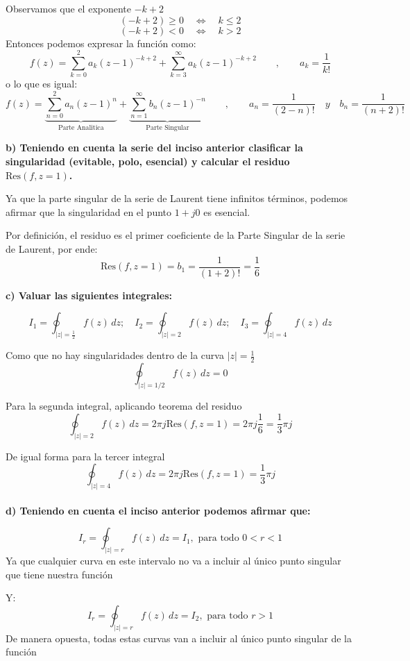 \documentclass[12pt,a4paper]{report}
\begin{document}
Observamos que el exponente $-k+2$
$$(-k+2) \geq 0 \quad \Leftrightarrow \quad k \leq 2$$
$$(-k+2) < 0 \quad \Leftrightarrow \quad k>2$$
Entonces podemos expresar la función como:
$$f(z) = \sum_{k=0}^{2}a_k(z - 1)^{-k+2} + \sum_{k=3}^{\infty}a_k(z - 1)^{-k+2}\qquad, \qquad a_k=\frac{1}{k!}$$
o lo que es igual:
$$f(z) = \underbrace{\sum_{n=0}^{2}a_n(z - 1)^{n}}_{\text{Parte Analitica}} + \underbrace{\sum_{n=1}^{\infty}b_n(z - 1)^{-n}}_{\text{Parte Singular}}
\qquad, \qquad a_n=\frac{1}{(2-n)!}\quad y \quad b_n=\frac{1}{(n+2)!}$$

\textbf{b)  Teniendo en cuenta la serie del inciso anterior clasificar la singularidad (evitable, polo, 
esencial) y calcular el residuo \( \text{Res}(f, z = 1) \).}

Ya que la parte singular de la serie de Laurent tiene infinitos términos, podemos afirmar que la singularidad
en el punto $1+j0$ es esencial.

Por definición, el residuo es el primer coeficiente de la Parte Singular de la serie de Laurent, por ende:
$$\text{Res}(f, z = 1) = b_1=\frac{1}{(1+2)!} = \frac{1}{6}$$

\textbf{c)  Valuar las siguientes integrales:}

$$ I_1 = \oint_{|z| =\frac{1}{2}} f(z) \, dz; \quad I_2 = \oint_{|z| = 2} f(z) \, dz; \quad I_3 = \oint_{|z| = 4} f(z) \, dz $$

Como que no hay singularidades dentro de la curva $|z|=\frac{1}{2}$
$$\oint_{|z| = 1/2} f(z) \, dz = 0$$

Para la segunda integral, aplicando teorema del residuo
$$\oint_{|z| = 2} f(z) \, dz = 2\pi j \text{Res}(f, z = 1) = 2\pi j\frac{1}{6}=\frac{1}{3}\pi j$$

De igual forma para la tercer integral
$$\oint_{|z| = 4} f(z) \, dz = 2\pi j \text{Res}(f, z = 1) =\frac{1}{3}\pi j$$\\

\textbf{d)  Teniendo en cuenta el inciso anterior podemos afirmar que:}

$$ I_r = \oint_{|z| = r} f(z) \, dz = I_1, \text{ para todo } 0 < r < 1 $$ 
Ya que cualquier curva en este intervalo no va a incluir al único punto singular que tiene nuestra función

Y:
$$ I_r = \oint_{|z| = r} f(z) \, dz = I_2, \text{ para todo } r > 1 $$ 
De manera opuesta, todas estas curvas van a incluir al único punto singular de la función

\chapter{}%
\end{document}
